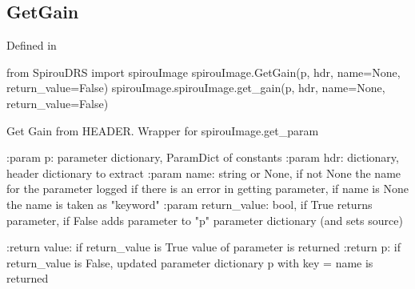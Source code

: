 \noindent\begin{minipage}{\textwidth}
\subsection{GetGain}

Defined in \spirouImage{}

\begin{pythonbox}
from SpirouDRS import spirouImage
spirouImage.GetGain(p, hdr, name=None, return_value=False)
spirouImage.spirouImage.get_gain(p, hdr, name=None, return_value=False)
\end{pythonbox}

\begin{pythondocstring}
Get Gain from HEADER. Wrapper for spirouImage.get_param

:param p: parameter dictionary, ParamDict of constants
:param hdr: dictionary, header dictionary to extract
:param name: string or None, if not None the name for the parameter
             logged if there is an error in getting parameter, if name is
             None the name is taken as "keyword"
:param return_value: bool, if True returns parameter, if False adds
                     parameter to "p" parameter dictionary (and sets source)

:return value: if return_value is True value of parameter is returned
:return p: if return_value is False, updated parameter dictionary p with
           key = name is returned
\end{pythondocstring}
\end{minipage}


